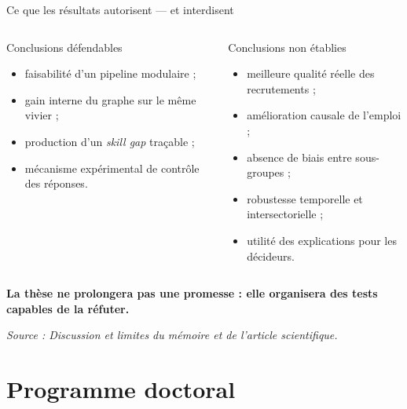 \documentclass[aspectratio=169,11pt]{beamer}
\newcommand{\sourceNote}[1]{%
  \vfill\par\tiny\color{KmerDarkGray}\textit{Source : #1}\par
}
\begin{document}
\begin{frame}{Ce que les résultats autorisent — et interdisent}
  \begin{columns}[T,onlytextwidth]
      \begin{block}{\centering Conclusions défendables}
        \begin{itemize}
          \item faisabilité d'un pipeline modulaire ;
          \item gain interne du graphe sur le même vivier ;
          \item production d'un \textit{skill gap} traçable ;
          \item mécanisme expérimental de contrôle des réponses.
        \end{itemize}
      \end{block}
      \begin{alertblock}{\centering Conclusions non établies}
        \begin{itemize}
          \item meilleure qualité réelle des recrutements ;
          \item amélioration causale de l'emploi ;
          \item absence de biais entre sous-groupes ;
          \item robustesse temporelle et intersectorielle ;
          \item utilité des explications pour les décideurs.
        \end{itemize}
      \end{alertblock}
  \end{columns}
  \vspace{-0.06cm}
  \begin{center}
    \textbf{La thèse ne prolongera pas une promesse : elle organisera des tests
    capables de la réfuter.}
  \end{center}
  \sourceNote{Discussion et limites du mémoire et de l'article scientifique.}
\end{frame}

\section{Programme doctoral}
\end{document}
